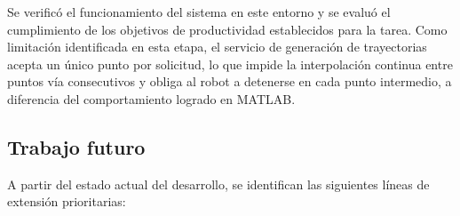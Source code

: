 \documentclass{article}
\begin{document}
Se verificó el funcionamiento del sistema en este entorno y se evaluó el cumplimiento de los objetivos de productividad establecidos para la tarea. Como limitación identificada en esta etapa, el servicio de generación de trayectorias acepta un único punto por solicitud, lo que impide la interpolación continua entre puntos vía consecutivos y obliga al robot a detenerse en cada punto intermedio, a diferencia del comportamiento logrado en MATLAB.

\subsection*{Trabajo futuro}

A partir del estado actual del desarrollo, se identifican las siguientes líneas de extensión prioritarias:
\end{document}
